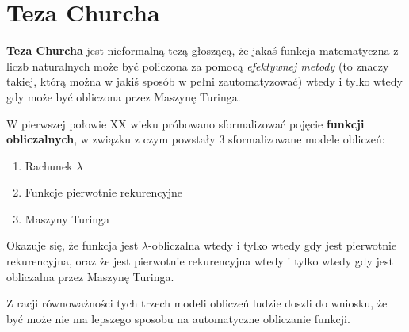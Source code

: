 \section{Teza Churcha}

\textbf{Teza Churcha} jest nieformalną tezą głoszącą, że jakaś funkcja matematyczna z liczb naturalnych może być policzona za pomocą \textit{efektywnej metody} (to znaczy takiej, którą można w jakiś sposób w pełni zautomatyzować) wtedy i tylko wtedy gdy może być obliczona przez Maszynę Turinga.

W pierwszej połowie XX wieku próbowano sformalizować pojęcie \textbf{funkcji obliczalnych}, w związku z czym powstały 3 sformalizowane modele obliczeń:

\begin{enumerate}
	\item Rachunek \(\lambda\)
	\item Funkcje pierwotnie rekurencyjne
	\item Maszyny Turinga
\end{enumerate}

Okazuje się, że funkcja jest \(\lambda\)-obliczalna wtedy i tylko wtedy gdy jest pierwotnie rekurencyjna, oraz że jest pierwotnie rekurencyjna wtedy i tylko wtedy gdy jest obliczalna przez Maszynę Turinga.

Z racji równoważności tych trzech modeli obliczeń ludzie doszli do wniosku, że być może nie ma lepszego sposobu na automatyczne obliczanie funkcji.